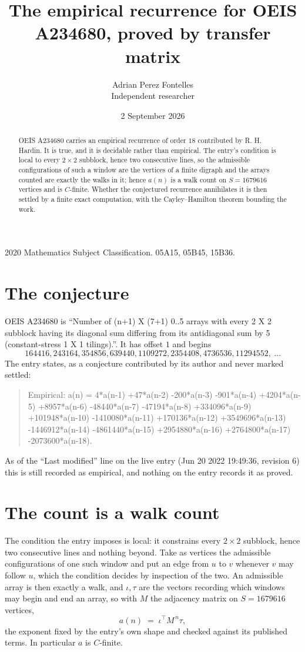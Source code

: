 \documentclass[11pt,a4paper]{article}
\title{The empirical recurrence for OEIS A234680, proved by transfer matrix}
\author{Adrian Perez Fontelles\\ \small Independent researcher}
\date{2 September 2026}
\theoremstyle{plain}
\theoremstyle{definition}
\begin{document}
\maketitle

\begin{abstract}
OEIS A234680 carries an empirical recurrence of order $18$ contributed by R. H. Hardin. It is
true, and it is decidable rather than empirical. The entry's condition is local to every $2\times2$ subblock, hence two consecutive lines, so
the admissible configurations of such a window are the vertices of a finite digraph and the
arrays counted are exactly the walks in it; hence $a(n)$ is a walk count on $S=1679616$ vertices
and is $C$-finite. Whether the conjectured recurrence annihilates it is then settled by a
finite exact computation, with the Cayley--Hamilton theorem bounding the work.
\end{abstract}

\noindent\small 2020 Mathematics Subject Classification. 05A15, 05B45, 15B36.\normalsize

\section{The conjecture}

OEIS A234680 is ``Number of (n+1) X (7+1) 0..5 arrays with every 2 X 2 subblock having its diagonal sum differing from its antidiagonal sum by 5 (constant-stress 1 X 1 tilings).''. It has offset $1$ and begins
\[
164416, 243164, 354856, 639440, 1109272, 2354408, 4736536, 11294552,\ \dots
\]
The entry states, as a conjecture contributed by its author and never marked settled:
\begin{quote}
Empirical: a(n) = 4*a(n-1) +47*a(n-2) -200*a(n-3) -901*a(n-4) +4204*a(n-5) +8957*a(n-6) -48440*a(n-7) -47194*a(n-8) +334096*a(n-9) +101948*a(n-10) -1410080*a(n-11) +170136*a(n-12) +3549696*a(n-13) -1446912*a(n-14) -4861440*a(n-15) +2954880*a(n-16) +2764800*a(n-17) -2073600*a(n-18).
\end{quote}
As of the ``Last modified'' line on the live entry (Jun 20 2022 19:49:36, revision 6) this is still
recorded as empirical, and nothing on the entry records it as proved.

\section{The count is a walk count}

The condition the entry imposes is local: it constrains every $2\times2$ subblock, hence two consecutive lines and nothing beyond. Take as vertices the admissible configurations of one such window and put an edge from $u$ to $v$ whenever $v$ may follow $u$, which the condition decides by inspection of the two.
An admissible array is then exactly a walk, and $\iota,\tau$ are the vectors recording which windows may begin and end an array, so with $M$ the adjacency matrix on $S=1679616$ vertices,
\[
a(n)\;=\;\iota^{\!\top}M^{\,n}\tau ,
\]
the exponent fixed by the entry's own shape and checked against its published terms. In
particular $a$ is $C$-finite.
\end{document}
